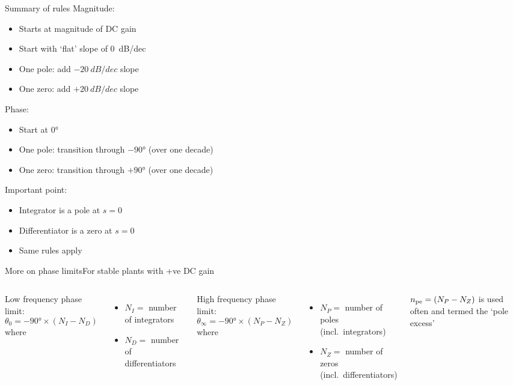 \documentclass[10pt]{beamer-control}
\begin{document}
\begin{frame}{Summary of rules}
  Magnitude:
  \begin{itemize}
    \item  Starts at magnitude of DC gain
    \item  Start with `flat' slope of \SI{0}{dB/dec}
    \item  One pole: add $-\SI{20}{dB/dec}$ slope
    \item  One zero: add $+\SI{20}{dB/dec}$ slope
  \end{itemize}
  Phase:
  \begin{itemize}
    \item  Start at \ang{0}
    \item  One pole: transition through $-\ang{90}$ (over one decade)
    \item  One zero: transition through $+\ang{90}$ (over one decade)
  \end{itemize}
  Important point:
  \begin{itemize}
    \item  Integrator is a pole at $s=0$
    \item  Differentiator is a zero at $s=0$
    \item  Same rules apply
  \end{itemize}
\end{frame}


\begin{frame}{More on phase limits}{For stable plants with +ve DC gain}
\begin{columns}[t]
\small
{}
Low frequency phase limit:
\begin{equation}
	\theta_0 = -\ang{90}\times(N_I-N_D)
\end{equation}
where
\begin{itemize}
\item $N_I =$ number of integrators
\item $N_D =$ number of differentiators
\end{itemize}

High frequency phase limit:
\begin{equation}
	\theta_\infty = -\ang{90}\times(N_P-N_Z)
\end{equation}
where
\begin{itemize}
\item $N_P =$ number of poles\\ (incl.\ integrators)
\item $N_Z =$ number of zeros\\ (incl.\ differentiators)
\end{itemize}
$n_{\text{pe}} = (N_P-N_Z)$ is used often and termed the `pole excess'


\end{columns}
\end{frame}
\end{document}
